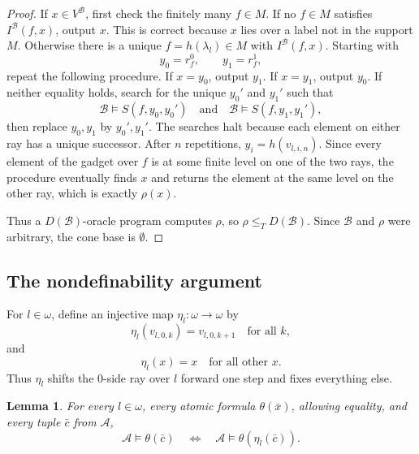 \documentclass[12pt]{article}
\newtheorem{lemma}[theorem]{Lemma}
\theoremstyle{definition}
\theoremstyle{remark}
\begin{document}
\begin{proof}
If \(x\in V^{\mathcal B}\), first check the finitely many \(f\in M\).  If no \(f\in M\) satisfies \(I^{\mathcal B}(f,x)\), output \(x\).  This is correct because \(x\) lies over a label not in the support \(M\).  Otherwise there is a unique \(f=h(\lambda_l)\in M\) with \(I^{\mathcal B}(f,x)\).  Starting with
\[
y_0=r_f^0,\qquad y_1=r_f^1,
\]
repeat the following procedure.  If \(x=y_0\), output \(y_1\).  If \(x=y_1\), output \(y_0\).  If neither equality holds, search for the unique \(y_0'\) and \(y_1'\) such that
\[
\mathcal B\models S(f,y_0,y_0')
\quad\text{and}\quad
\mathcal B\models S(f,y_1,y_1'),
\]
then replace \(y_0,y_1\) by \(y_0',y_1'\).  The searches halt because each element on either ray has a unique successor.  After \(n\) repetitions, \(y_i=h(v_{l,i,n})\).  Since every element of the gadget over \(f\) is at some finite level on one of the two rays, the procedure eventually finds \(x\) and returns the element at the same level on the other ray, which is exactly \(\rho(x)\).

Thus a \(D(\mathcal B)\)-oracle program computes \(\rho\), so \(\rho\leq_TD(\mathcal B)\).  Since \(\mathcal B\) and \(\rho\) were arbitrary, the cone base is \(\emptyset\).
\end{proof}

\subsection{The nondefinability argument}\label{sec:nondef}

For \(l\in\omega\), define an injective map \(\eta_l:\omega\to\omega\) by
\[
\eta_l(v_{l,0,k})=v_{l,0,k+1}
\quad\text{for all }k,
\]
and
\[
\eta_l(x)=x
\quad\text{for all other }x.
\]
Thus \(\eta_l\) shifts the \(0\)-side ray over \(l\) forward one step and fixes everything else.

\begin{lemma}\label{lem:eta-atomic}
For every \(l\in\omega\), every atomic formula \(\theta(\bar x)\), allowing equality, and every tuple \(\bar c\) from \(\mathcal A\),
\[
\mathcal A\models \theta(\bar c)
\quad\Longleftrightarrow\quad
\mathcal A\models \theta(\eta_l(\bar c)).
\]
\end{lemma}
\end{document}
